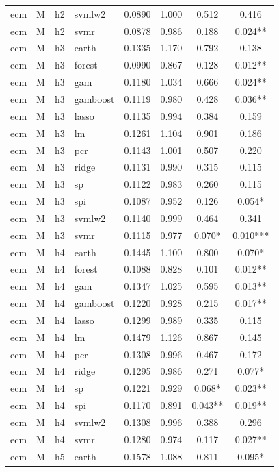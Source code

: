 \begin{ThreePartTable}
\begin{longtable}[t]{llclcccc}
ecm & M & h2 & svmlw2 & 0.0890 & 1.000 & 0.512 & 0.416\\
ecm & M & h2 & svmr & 0.0878 & 0.986 & 0.188 & 0.024**\\
\addlinespace
ecm & M & h3 & earth & 0.1335 & 1.170 & 0.792 & 0.138\\
ecm & M & h3 & forest & 0.0990 & 0.867 & 0.128 & 0.012**\\
ecm & M & h3 & gam & 0.1180 & 1.034 & 0.666 & 0.024**\\
ecm & M & h3 & gamboost & 0.1119 & 0.980 & 0.428 & 0.036**\\
ecm & M & h3 & lasso & 0.1135 & 0.994 & 0.384 & 0.159\\
ecm & M & h3 & lm & 0.1261 & 1.104 & 0.901 & 0.186\\
ecm & M & h3 & pcr & 0.1143 & 1.001 & 0.507 & 0.220\\
ecm & M & h3 & ridge & 0.1131 & 0.990 & 0.315 & 0.115\\
ecm & M & h3 & sp & 0.1122 & 0.983 & 0.260 & 0.115\\
ecm & M & h3 & spi & 0.1087 & 0.952 & 0.126 & 0.054*\\
ecm & M & h3 & svmlw2 & 0.1140 & 0.999 & 0.464 & 0.341\\
ecm & M & h3 & svmr & 0.1115 & 0.977 & 0.070* & 0.010***\\
\addlinespace
ecm & M & h4 & earth & 0.1445 & 1.100 & 0.800 & 0.070*\\
ecm & M & h4 & forest & 0.1088 & 0.828 & 0.101 & 0.012**\\
ecm & M & h4 & gam & 0.1347 & 1.025 & 0.595 & 0.013**\\
ecm & M & h4 & gamboost & 0.1220 & 0.928 & 0.215 & 0.017**\\
ecm & M & h4 & lasso & 0.1299 & 0.989 & 0.335 & 0.115\\
ecm & M & h4 & lm & 0.1479 & 1.126 & 0.867 & 0.145\\
ecm & M & h4 & pcr & 0.1308 & 0.996 & 0.467 & 0.172\\
ecm & M & h4 & ridge & 0.1295 & 0.986 & 0.271 & 0.077*\\
ecm & M & h4 & sp & 0.1221 & 0.929 & 0.068* & 0.023**\\
ecm & M & h4 & spi & 0.1170 & 0.891 & 0.043** & 0.019**\\
ecm & M & h4 & svmlw2 & 0.1308 & 0.996 & 0.388 & 0.296\\
ecm & M & h4 & svmr & 0.1280 & 0.974 & 0.117 & 0.027**\\
\addlinespace
ecm & M & h5 & earth & 0.1578 & 1.088 & 0.811 & 0.095*\\

\end{longtable}
\end{ThreePartTable}
